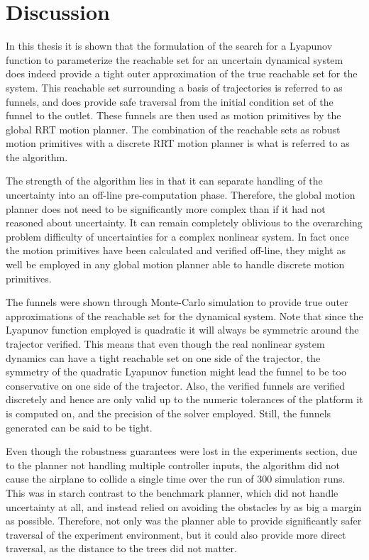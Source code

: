 \chapter{Discussion}
\label{chp:discussion}

In this thesis it is shown that the formulation of the search for a Lyapunov
function to parameterize the reachable set for an uncertain dynamical system
does indeed provide a tight outer approximation of the true reachable set for
the system. This reachable set surrounding a basis of trajectories is referred
to as funnels, and does provide safe traversal from the initial condition set of
the funnel to the outlet. These funnels are then used as motion primitives by
the global \ac{RRT} motion planner. The combination of the reachable sets as
robust motion primitives with a discrete \ac{RRT} motion planner is what is
referred to as the \rrtfunnel{} algorithm.

The strength of the algorithm lies in that it can separate handling of the
uncertainty into an off-line pre-computation phase. Therefore, the global motion
planner does not need to be significantly more complex than if it had not
reasoned about uncertainty. It can remain completely oblivious to
the overarching problem difficulty of uncertainties for a complex nonlinear
system. In fact once the motion primitives have been calculated and verified
off-line, they might as well be employed in any global motion planner able to
handle discrete motion primitives.

The funnels were shown through Monte-Carlo simulation to provide true outer
approximations of the reachable set for the dynamical system. Note that since
the Lyapunov function employed is quadratic it will always be symmetric around
the trajector verified. This means that even though the real nonlinear system
dynamics can have a tight reachable set on one side of the trajector, the
symmetry of the quadratic Lyapunov function might lead the funnel to be too
conservative on one side of the trajector. Also, the verified funnels are
verified discretely and hence are only valid up to the numeric tolerances of the
platform it is computed on, and the precision of the solver employed. Still, the
funnels generated can be said to be tight.

Even though the robustness guarantees were lost in the experiments section, due
to the planner not handling multiple controller inputs, the \rrtfunnel{}
algorithm did not cause the airplane to collide a single time over the run of
\(300\) simulation runs. This was in starch contrast to the benchmark planner,
which did not handle uncertainty at all, and instead relied on avoiding the
obstacles by as big a margin as possible. Therefore, not only was the
\rrtfunnel{} planner able to provide significantly safer traversal of the
experiment environment, but it could also provide more direct traversal, as the
distance to the trees did not matter.

